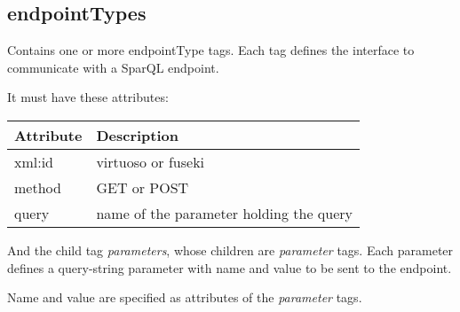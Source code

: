 	\subsection{endpointTypes}
Contains one or more endpointType tags.
Each tag defines the interface to communicate with a SparQL endpoint.

It must have these attributes:
\begin{center}
	\begin{tabular}{ | p{} | p{} | }
		\hline
		Attribute & Description \\ 
		\hline
		xml:id & virtuoso or fuseki \\  
		\hline
		method & GET or POST \\
		\hline
		query & name of the parameter holding the query \\
		\hline
	\end{tabular}
\end{center}

And the child tag \textit{parameters}, whose children are \textit{parameter} tags.
Each parameter defines a query-string parameter with name and value to be sent to the endpoint.

Name and value are specified as attributes of the \textit{parameter} tags.

